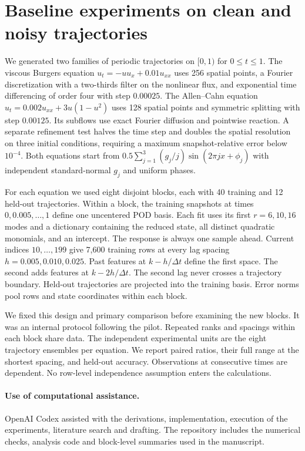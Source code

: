 \documentclass[11pt,a4paper]{article}
\begin{document}
\section{Baseline experiments on clean and noisy trajectories}
We generated two families of periodic trajectories on $[0,1)$ for $0\le t\le1$. The viscous Burgers equation $u_t=-u u_x+0.01u_{xx}$ uses 256 spatial points, a Fourier discretization with a two-thirds filter on the nonlinear flux, and exponential time differencing of order four \cite{etd} with step $0.00025$. The Allen--Cahn equation $u_t=0.002u_{xx}+3u(1-u^2)$ uses 128 spatial points and symmetric splitting with step $0.00125$. Its subflows use exact Fourier diffusion and pointwise reaction. A separate refinement test halves the time step and doubles the spatial resolution on three initial conditions, requiring a maximum snapshot-relative error below $10^{-4}$. Both equations start from $0.5\sum_{j=1}^3(g_j/j)\sin(2\pi jx+\phi_j)$ with independent standard-normal $g_j$ and uniform phases.

For each equation we used eight disjoint blocks, each with 40 training and 12 held-out trajectories. Within a block, the training snapshots at times $0,0.005,\ldots,1$ define one uncentered POD basis. Each fit uses its first $r=6,10,16$ modes and a dictionary containing the reduced state, all distinct quadratic monomials, and an intercept. The response is always one sample ahead. Current indices $10,\ldots,199$ give 7,600 training rows at every lag spacing $h=0.005,0.010,0.025$. Past features at $k-h/\Delta t$ define the first space. The second adds features at $k-2h/\Delta t$. The second lag never crosses a trajectory boundary. Held-out trajectories are projected into the training basis. Error norms pool rows and state coordinates within each block.

We fixed this design and primary comparison before examining the new blocks. It was an internal protocol following the pilot. Repeated ranks and spacings within each block share data. The independent experimental units are the eight trajectory ensembles per equation. We report paired ratios, their full range at the shortest spacing, and held-out accuracy. Observations at consecutive times are dependent. No row-level independence assumption enters the calculations.

\paragraph{Use of computational assistance.} OpenAI Codex assisted with the derivations, implementation, execution of the experiments, literature search and drafting. The repository includes the numerical checks, analysis code and block-level summaries used in the manuscript.
\end{document}

